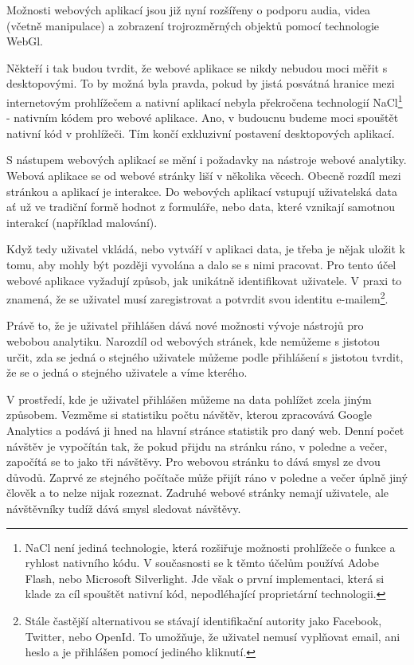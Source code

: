 \documentclass[bc,female,java,dept456]{diploma}						%
\begin{document}
Možnosti webových aplikací jsou již nyní rozšířeny o podporu audia, videa (včetně manipulace) a zobrazení trojrozměrných objektů pomocí technologie WebGl. 

Někteří i tak budou tvrdit, že webové aplikace se nikdy nebudou moci měřit s desktopovými. To by možná byla pravda, pokud by jistá posvátná hranice mezi internetovým prohlížečem a nativní aplikací nebyla překročena technologií NaCl\footnote{NaCl není jediná technologie, která rozšiřuje možnosti prohlížeče o funkce a ryhlost nativního kódu. V současnosti se k těmto účelům používá Adobe Flash, nebo Microsoft Silverlight. Jde však o první implementaci, která si klade za cíl spouštět nativní kód, nepodléhající proprietární technologii.} - nativním kódem pro webové aplikace. Ano, v budoucnu budeme moci spouštět nativní kód v prohlížeči. Tím končí exkluzivní postavení desktopových aplikací.

\bigskip

S nástupem webových aplikací se mění i požadavky na nástroje webové analytiky. Webová aplikace se od webové stránky liší v několika věcech. Obecně rozdíl mezi stránkou a aplikací je interakce. Do webových aplikací vstupují uživatelská data ať už ve tradiční formě hodnot z formuláře, nebo data, které vznikají samotnou interakcí (například  malování). 

Když tedy uživatel vkládá, nebo vytváří v aplikaci data, je třeba je nějak uložit k tomu, aby mohly být později vyvolána a dalo se s nimi pracovat. Pro tento účel webové aplikace vyžadují způsob, jak unikátně identifikovat uživatele. V praxi to znamená, že se uživatel musí zaregistrovat a potvrdit svou identitu e-mailem\footnote{Stále častější alternativou se stávají identifikační autority jako Facebook, Twitter, nebo OpenId. To umožňuje, že uživatel nemusí vyplňovat email, ani heslo a je přihlášen pomocí jediného kliknutí.}.

Právě to, že je uživatel přihlášen dává nové možnosti vývoje nástrojů pro webobou analytiku. Narozdíl od webových stránek, kde nemůžeme s jistotou určit, zda se jedná o stejného uživatele můžeme podle přihlášení s jistotou tvrdit, že se o jedná o stejného uživatele a víme kterého.

V prostředí, kde je uživatel přihlášen můžeme na data pohlížet zcela jiným způsobem. Vezměme si statistiku počtu návštěv, kterou zpracovává Google Analytics a podává ji hned na hlavní stránce statistik pro daný web. Denní počet návštěv je vypočítán tak, že pokud přijdu na stránku ráno, v poledne a večer, započítá se to jako tři návštěvy. Pro webovou stránku to dává smysl ze dvou důvodů. Zaprvé ze stejného počítače může přijít ráno v poledne a večer úplně jiný člověk a to nelze nijak rozeznat. Zadruhé webové stránky nemají uživatele, ale návštěvníky tudíž dává smysl sledovat návštěvy. 
\end{document}
